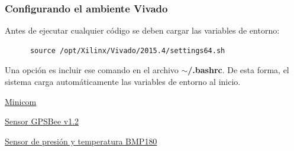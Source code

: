 \documentclass[a4paper,11pt]{article}
\begin{document}
\subsubsection{Configurando el ambiente Vivado}
    Antes de ejecutar cualquier código se deben cargar las variables de entorno:
    \begin{verbatim}
      source /opt/Xilinx/Vivado/2015.4/settings64.sh
    \end{verbatim}
    Una opción es incluir ese comando en el archivo \textbf{$\sim$/.bashrc}. De
esta
    forma, el sistema carga automáticamente las variables de entorno al inicio.

\begin{thebibliography}{9}

\href{https://es.wikipedia.org/wiki/Minicom}{Minicom}

\href{http://wiki.seeedstudio.com/GPS\_Bee\_kit/}{Sensor GPSBee v1.2}

\href{https://www.adafruit.com/product/1603}{Sensor de presión y temperatura
BMP180}


\end{thebibliography}
\end{document}
